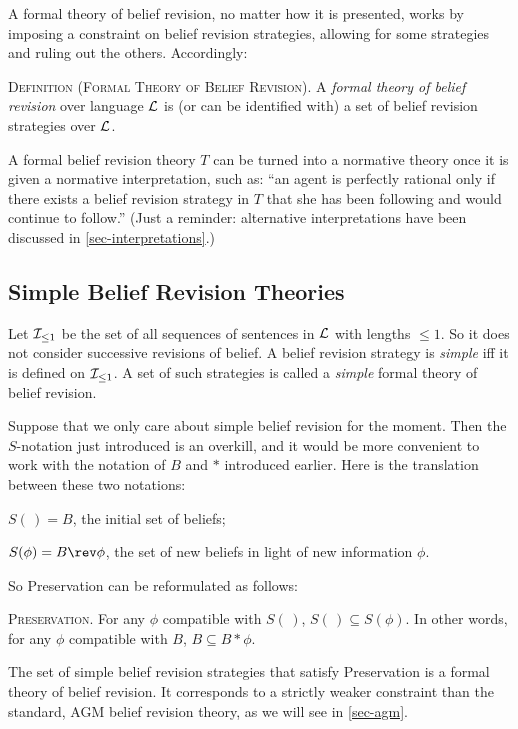 A formal theory of belief revision, no matter how it is presented, works by imposing a constraint on belief revision strategies, allowing for some strategies and ruling out the others. Accordingly: \op

	\xm \textsc{Definition (Formal Theory of Belief Revision).} A {\em formal theory of belief revision} over language ${\cal L}$ is (or can be identified with) a set of belief revision strategies over ${\cal L}$. 

\ed A formal belief revision theory $T$ can be turned into a normative theory once it is given a normative interpretation, such as: ``an agent is perfectly rational only if there exists a belief revision strategy in $T$ that she has been following and would continue to follow.'' (Just a reminder: alternative interpretations have been discussed in \autoref{sec-interpretations}.)

\subsection{Simple Belief Revision Theories}

Let ${\cal I}_{\le 1}$ be the set of all sequences of sentences in ${\cal L}$ with lengths $\leq 1$. So it does not consider successive revisions of belief. A belief revision strategy is {\em simple} iff it is defined on ${\cal I}_{\le 1}$. A set of such strategies is called a {\em simple} formal theory of belief revision.

Suppose that we only care about simple belief revision for the moment. Then the $S$-notation just introduced is an overkill, and it would be more convenient to work with the notation of $B$ and $*$ introduced earlier. Here is the translation between these two notations: \op

	\xm $S(\,) = B$, the initial set of beliefs;

	\xm $S(\phi) = B \rev \phi$, the set of new beliefs in light of new information $\phi$. 

\ed So Preservation can be reformulated as follows: \op

	\xm \textsc{Preservation.}  For any $\phi$ compatible with $S(\,)$, $S(\,) \subseteq S(\phi)$.
	In other words, for any $\phi$ compatible with $B$, $B \subseteq B * \phi$.

\ed The set of simple belief revision strategies that satisfy Preservation is a formal theory of belief revision. It corresponds to a strictly weaker constraint than the standard, AGM belief revision theory, as we will see in \autoref{sec-agm}.


